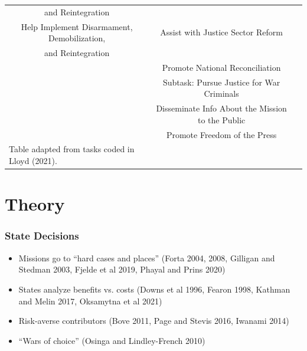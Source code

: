 \documentclass{beamer}
\begin{document}
\begin{frame}[fragile]
\begin{table}[t]
\begin{tabular}{c*{2}{c}}
 and Reintegration                                      & \\
[0.5em]
Help Implement Disarmament, Demobilization,             & Assist with Justice Sector Reform \\ 
and Reintegration                                       & \\
[0.5em]
                                                        & Promote National Reconciliation \\
                                                        & Subtask: Pursue Justice for War Criminals \\
[0.25em]
                                                        & Disseminate Info About the Mission to the Public \\
[0.25em]
                                                        & Promote Freedom of the Press \\                                                                            
\hline\hline
\multicolumn{1}{l}{\fontsize{5}{4}\selectfont Table adapted from tasks coded in Lloyd (2021).}\\

\end{tabular}
\end{table}


\end{frame}


\section{Theory}


\begin{frame}
\frametitle{State Decisions}

\begin{itemize}
  \pause
  \item Missions go to ``hard cases and places'' {\tiny (Forta 2004, 2008, Gilligan and Stedman 2003, Fjelde et al 2019, Phayal and Prins 2020)}
  \pause
  \item States analyze benefits vs. costs {\tiny (Downs et al 1996, Fearon 1998, Kathman and Melin 2017, Oksamytna et al 2021)}
  \pause
  \item Risk-averse contributors {\tiny (Bove 2011, Page and Stevis 2016, Iwanami 2014)}
  \pause
  \item ``Wars of choice'' {\tiny (Osinga and Lindley-French 2010)}
\end{itemize}

\end{frame}
\end{document}
